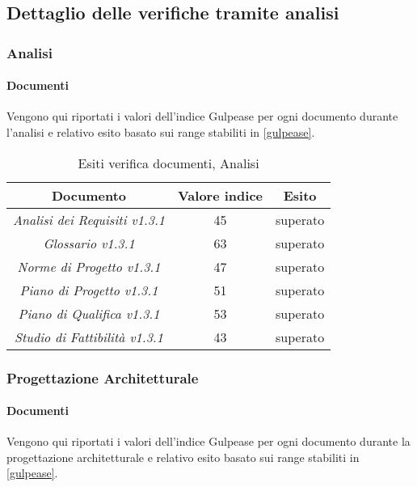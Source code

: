 	 
	 \subsection{Dettaglio delle verifiche tramite analisi}
	 \label{DettaglioVerificheAnalisi}
	 
	 	\subsubsection{Analisi}
	 	\paragraph{Documenti}
	 	Vengono qui riportati i valori dell’indice Gulpease per ogni documento durante l'analisi e relativo esito basato sui range stabiliti in \ref{gulpease}.
	
		\begin{table}[H]
		\centering
		\begin{tabular}{ | c | c | c | }
	    \hline
	    Documento & Valore indice & Esito \\ \hline
	     \emph{Analisi dei Requisiti v1.3.1} & 45 &  superato \\ \hline
	     \emph{Glossario v1.3.1} & 63 &  superato \\ \hline
	     \emph{Norme di Progetto v1.3.1} & 47 &  superato \\ \hline
	     \emph{Piano di Progetto v1.3.1} & 51 &  superato \\ \hline
	     \emph{Piano di Qualifica v1.3.1} & 53 &  superato \\ \hline
	     \emph{Studio di Fattibilità v1.3.1} & 43 &  superato \\ \hline
	    \end{tabular}
		\caption{Esiti verifica documenti, Analisi}
		\end{table}
		
	
	\subsubsection{Progettazione Architetturale}
	\paragraph{Documenti}
	 Vengono qui riportati i valori dell’indice Gulpease per ogni documento durante la progettazione architetturale e relativo esito basato sui range stabiliti in \ref{gulpease}.
	
